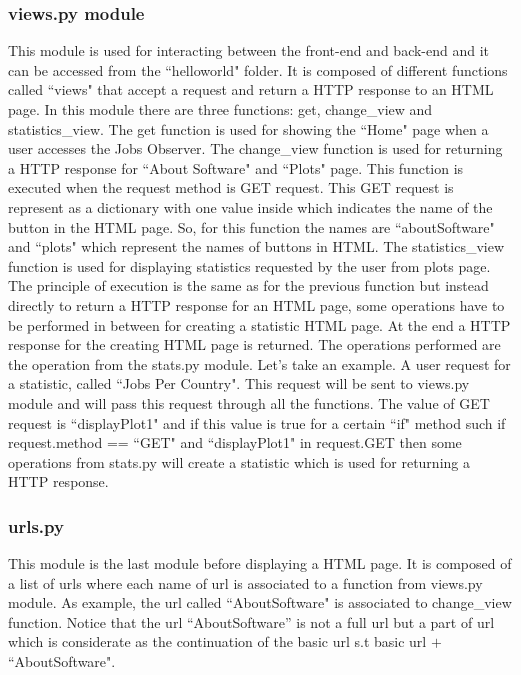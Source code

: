 \documentclass[conference,compsoc]{IEEEtran}
\begin{document}
\subsubsection{views.py module} 
This module is used for interacting between the front-end and back-end and it can be accessed from the ``helloworld" folder. It is composed of different functions called ``views" that accept a request and return a HTTP response to an HTML page. In this module there are three functions: get, change\_view and statistics\_view. 
\newline                                                                                                                       
The get function is used for showing the ``Home" page when a user accesses the Jobs Observer. The change\_view function is used for returning a HTTP response for ``About Software" and ``Plots" page. This function is executed when the request method is GET request. This GET request is represent as a dictionary with one value inside which indicates the name of the button in the HTML page. So, for this function the names are ``aboutSoftware" and ``plots" which represent the names of buttons in HTML.
\newline                                                                                             
The statistics\_view function is used for displaying statistics requested by the user from plots page. The principle of execution is the same as for the previous function but instead directly to return a HTTP response for an HTML page, some operations have to be performed in between for creating a statistic HTML page. At the end a HTTP response for the creating HTML page is returned. The operations performed are the operation from the stats.py module. 
\newline
Let’s take an example. A user request for a statistic, called ``Jobs Per Country". This request will be sent to views.py module and will pass this request  
through all the functions. The value of GET request is ``displayPlot1" and if this value is true for a certain ``if" method such if request.method == ``GET" and ``displayPlot1" in request.GET then some operations from stats.py will create a statistic which is used for returning a HTTP response.  

\subsubsection{urls.py}
This module is the last module before displaying a HTML page. It is composed of a list of urls where each name of url is associated to a function from views.py module. As example, the url called ``AboutSoftware" is associated to change\_view function.  Notice that the url “AboutSoftware” is not a full url but a part of url which is considerate as the continuation of the basic url s.t basic url $+$ ``AboutSoftware".
\end{document}
